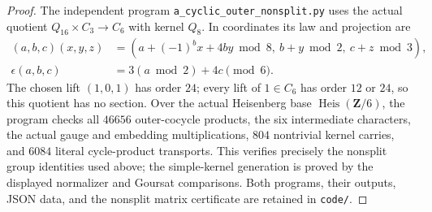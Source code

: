 \begin{proof}
The independent program
\texttt{a\_cyclic\_outer\_nonsplit.py}
uses the actual quotient \(Q_{16}\times C_3\to C_6\)
with kernel \(Q_8\). In coordinates its law and
projection are
\[
 \begin{split}
 (a,b,c)(x,y,z)&=
 (a+(-1)^b x+4by\bmod8,\ b+y\bmod2,\ c+z\bmod3),\\
 \epsilon(a,b,c)&=3(a\bmod2)+4c\pmod6.
 \end{split}
 \tag{D.47.25}
\]
The chosen lift \((1,0,1)\) has order \(24\);
every lift of \(1\in C_6\) has order \(12\) or \(24\),
so this quotient has no section. Over the actual
Heisenberg base \(\operatorname{Heis}(\mathbf Z/6)\),
the program checks all \(46656\) outer-cocycle
products, the six intermediate characters, the
actual gauge and embedding multiplications, \(804\)
nontrivial kernel carries, and \(6084\) literal
cycle-product transports. This verifies precisely
the nonsplit group identities used above; the
simple-kernel generation is proved by the displayed
normalizer and Goursat comparisons. Both programs,
their outputs, JSON data, and the nonsplit matrix
certificate are retained in \texttt{code/}.
\end{proof}
